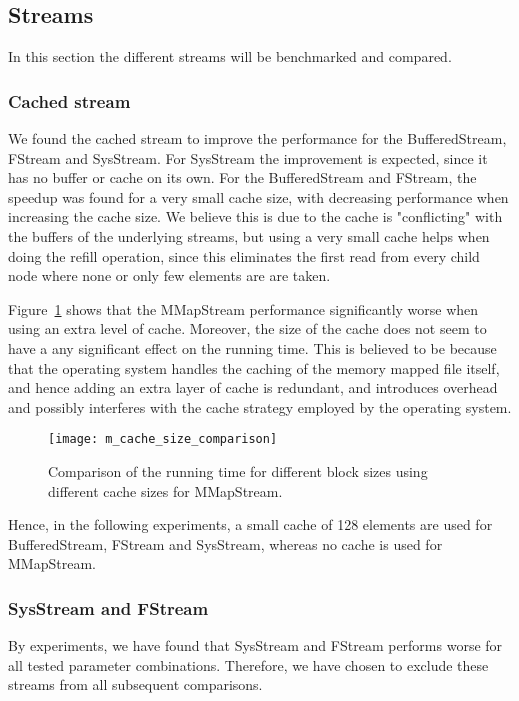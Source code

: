 \subsection{Streams}
In this section the different streams will be benchmarked and compared.

\subsubsection{Cached stream}
We found the cached stream to improve the performance for the BufferedStream, FStream and SysStream. For SysStream the improvement is expected, since it has no buffer or cache on its own. For the BufferedStream and FStream, the speedup was found for a very small cache size, with decreasing performance when increasing the cache size. We believe this is due to the cache is "conflicting" with the buffers of the underlying streams, but using a very small cache helps when doing the refill operation, since this eliminates the first read from every child node where none or only few elements are are taken.

Figure~\ref{fig:m-cache-size-comparison} shows that the MMapStream performance significantly worse when using an extra level of cache. Moreover, the size of the cache does not seem to have a any significant effect on the running time. This is believed to be because that the operating system handles the caching of the memory mapped file itself, and hence adding an extra layer of cache is redundant, and introduces overhead and possibly interferes with the cache strategy employed by the operating system.

\begin{figure}
  \centering
  \texttt{[image: m\_cache\_size\_comparison]}
  \caption{Comparison of the running time for different block sizes using different cache sizes for MMapStream.}
  \label{fig:m-cache-size-comparison}
\end{figure}

Hence, in the following experiments, a small cache of 128 elements are used for BufferedStream, FStream and SysStream, whereas no cache is used for MMapStream.

\subsubsection{SysStream and FStream}
By experiments, we have found that SysStream and FStream performs worse for all tested parameter combinations. Therefore, we have chosen to exclude these streams from all subsequent comparisons.

